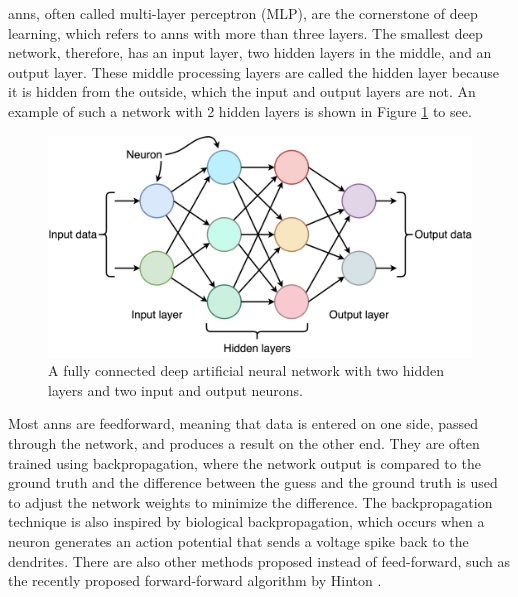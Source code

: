    \glspl{ann}, often called multi-layer perceptron (MLP), are the cornerstone of deep learning, which refers to \glspl{ann} with more than three layers. The smallest deep network, therefore, has an input layer, two hidden layers in the middle, and an output layer. These middle processing layers are called the hidden layer because it is hidden from the outside, which the input and output layers are not. An example of such a network with 2 hidden layers is shown in Figure \ref{fig:deep_network} to see. 


    \begin{figure}[htb]
        \centering
        \includegraphics[width=12cm]{images/deep_neural_network.png}
        \caption{A fully connected deep artificial neural network with two hidden layers and two input and output neurons.}
        \label{fig:deep_network}
    \end{figure}

   
    
    Most \glspl{ann} are feedforward, meaning that data is entered on one side, passed through the network, and produces a result on the other end. They are often trained using backpropagation, where the network output is compared to the ground truth and the difference between the guess and the ground truth is used to adjust the network weights to minimize the difference. The backpropagation technique is also inspired by biological backpropagation, which occurs when a neuron generates an action potential that sends a voltage spike back to the dendrites. There are also other methods proposed instead of feed-forward, such as the recently proposed forward-forward algorithm by Hinton \cite{hintonForwardForwardAlgorithmPreliminary2022}.
    
